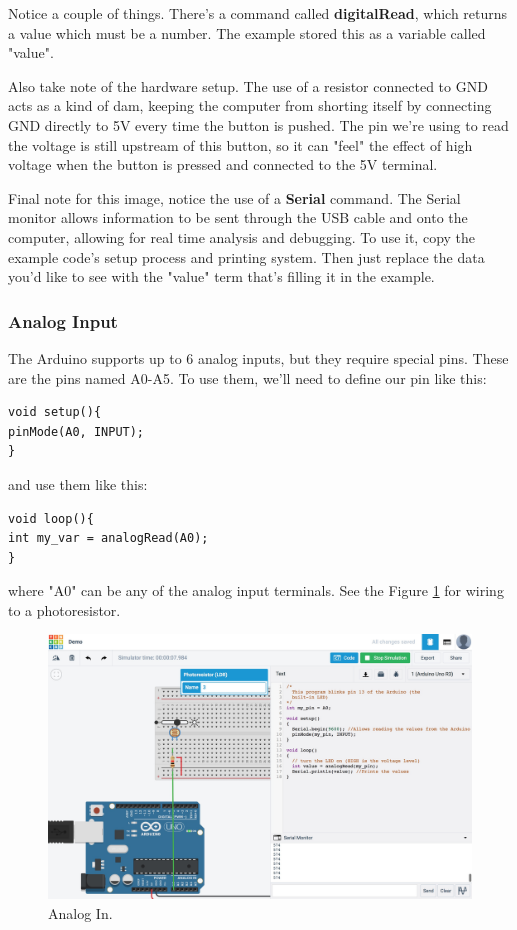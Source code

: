 \documentclass[a4paper]{article}
\begin{document}
Notice a couple of things. There's a command called \textbf{digitalRead}, which returns a value which must be a number. The example stored this as a variable called "value".

Also take note of the hardware setup. The use of a resistor connected to GND acts as a kind of dam, keeping the computer from shorting itself by connecting GND directly to 5V every time the button is pushed. The pin we're using to read the voltage is still upstream of this button, so it can "feel" the effect of high voltage when the button is pressed and connected to the 5V terminal.

Final note for this image, notice the use of a \textbf{Serial} command. The Serial monitor allows information to be sent through the USB cable and onto the computer, allowing for real time analysis and debugging. To use it, copy the example code's setup process and printing system. Then just replace the data you'd like to see with the "value" term that's filling it in the example.

\subsubsection{Analog Input}
The Arduino supports up to 6 analog inputs, but they require special pins. These are the pins named A0-A5. To use them, we'll need to define our pin like this:

\begin{verbatim}
void setup(){
pinMode(A0, INPUT);
}
\end{verbatim}
and use them like this:
\begin{verbatim}
void loop(){
int my_var = analogRead(A0);
}
\end{verbatim}
where "A0" can be any of the analog input terminals. See the Figure \ref{fig:analog_in} for wiring to a photoresistor.


\begin{figure}
\centering
\includegraphics[width=1\textwidth]{1-2.jpg}
\caption{\label{fig:analog_in}Analog In.}
\end{figure}
\end{document}
